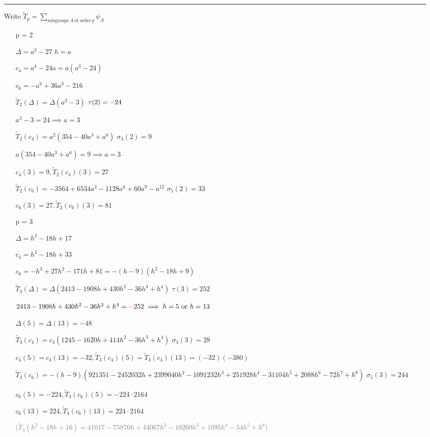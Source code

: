\documentclass{rs}
\theoremstyle{definition}
\theoremstyle{remark}
\numberwithin{equation}{section}
\numberwithin{thm}{section}
\begin{document}
\hrule

Write $\tilde{T}_p = \sum_{\text{subgroups} ~ A ~ \text{of order} ~ p} \psi_A$ 
\begin{itemize}
 \item [p = 2]

 $\Delta = a^3 - 27$ \hfill $h = a$ 

 $c_4 = a^4 - 24 a = a (a^3 - 24)$ 

 $c_6 = -a^6 + 36 a^3 - 216$ 

 $\tilde{T}_2(\Delta) = \Delta (a^3 - 3)$ \hfill $\tau(2) = \textcolor{red}{-}24$ 

 \hfill $a^3 - 3 = 24 \implies a = 3$ 

 $\tilde{T}_2(c_4) = a^2 (354 - 40 a^3 + a^6)$ \hfill $\sigma_3(2) = 9$ 

 \hfill $a (354 - 40 a^3 + a^6) = 9 \implies a = 3$ 

 \hfill $c_4(3) = 9, \tilde{T}_2(c_4)(3) = 27$ 

 $\tilde{T}_2(c_6) = -3564 + 6534 a^3 - 1128 a^6 + 60 a^9 - a^{12}$ \hfill $\sigma_5(2) = 33$ 

 \hfill $c_6(3) = 27, \tilde{T}_2(c_6)(3) = 81$ 

 \item [p = 3]

 $\Delta = h^2 - 18 h + 17$ 

 $c_4 = h^2 - 18 h + 33$ 

 $c_6 = -h^3 + 27 h^2 - 171 h + 81 = -(h - 9) (h^2 - 18 h + 9)$ 

 $\tilde{T}_3(\Delta) = \Delta (2413 - 1908 h + 430 h^2 - 36 h^3 + h^4)$ \hfill $\tau(3) = 252$ 

 \hfill $2413 - 1908 h + 430 h^2 - 36 h^3 + h^4 = \textcolor{red}{-}252 \implies h = 5 ~\text{or}~ h = 13$ 

 \hfill $\Delta(5) = \Delta(13) = -48$ 

 $\tilde{T}_3(c_4) = c_4 (1245 - 1620 h + 414 h^2 - 36 h^3 + h^4)$ \hfill $\sigma_3(3) = 28$ 

 \hfill $c_4(5) = c_4(13) = -32, \tilde{T}_3(c_4)(5) = \tilde{T}_3(c_4)(13) = (-32) (-380)$ 

 $\tilde{T}_3(c_6) = -(h - 9) (921351 - 2452032 h + 2399040 h^2 - 1091232 h^3 + 251928 h^4 - 31104 h^5 + 2088 h^6 - 72 h^7 + h^8)$ \hfill $\sigma_5(3) = 244$ 

 \hfill $c_6(5) = -224, \tilde{T}_3(c_6)(5) = -224 \cdot 2164$ 

 \hfill $c_6(13) = 224, \tilde{T}_3(c_6)(13) = 224 \cdot 2164$ 

 \textcolor{gray}{($\tilde{T}_3(h^2 - 18 h + 16) = 41017 - 75870 h + 44067 h^2 - 10260 h^3 + 1095 h^4 - 54 h^5 + h^6$) }
\end{itemize}
\end{document}
